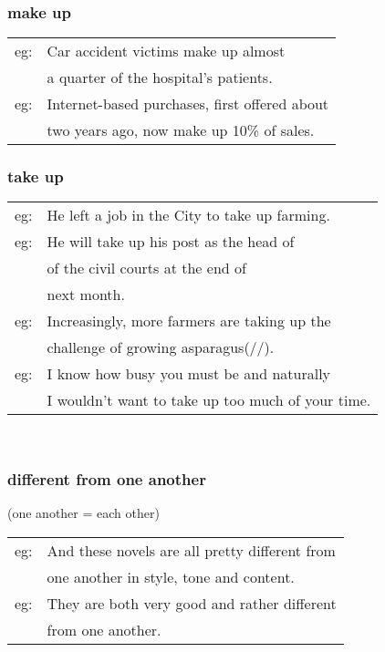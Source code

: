 \documentclass[14pt, t]{beamer}
\begin{document}
\begin{frame}
\frametitle{make up}
\begin{tabular}{ll}
eg: & Car accident victims make up almost \\[1pt]
& a quarter of the hospital's patients. \\[8pt]
eg: & Internet-based purchases, first offered about \\[1pt]
	& two years ago, now make up 10\% of sales. \\[8pt]
\end{tabular}
\end{frame}
\begin{frame}
\frametitle{take up}
\begin{tabular}{ll}
eg: & He left a job in the City to take up farming. \\[8pt]
eg: & He will take up his post as the head of \\[1pt]
	& of the civil courts at the end of \\[1pt]
	& next month. \\[8pt]
eg: & Increasingly, more farmers are taking up the \\[1pt]
	& challenge of growing asparagus(/\textipa{@'sber@g@s}/). \\[8pt]
eg: & I know how busy you must be and naturally \\[1pt]
	& I wouldn't want to take up too much of your time. \\
\end{tabular} \\
\end{frame}
\begin{frame}
\frametitle{different from one another}
(one another = each other) \\[8pt]
\begin{tabular}{ll}
eg: & And these novels are all pretty different from\\[1pt]
	&  one another in style, tone and content. \\[8pt]
eg: & They are both very good and rather different \\[1pt]
	& from one another. \\
\end{tabular} \\
\end{frame}
\end{document}
